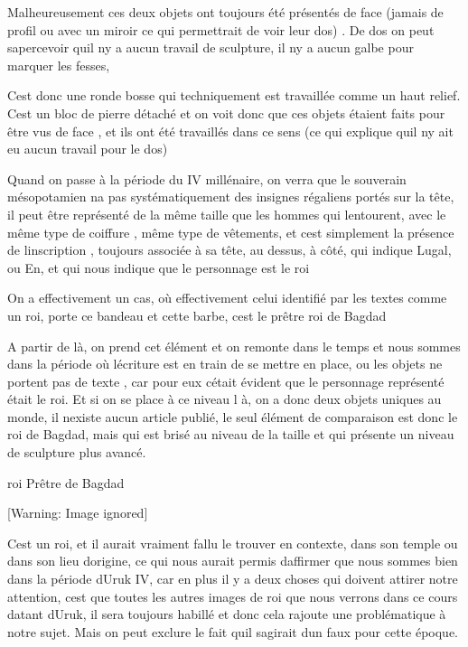 \documentclass{article}
\begin{document}
Malheureusement ces deux objets ont toujours été présentés de face
(jamais de profil ou avec un miroir ce qui permettrait de voir leur
dos) . De dos on peut s{\textquotesingle}apercevoir
qu{\textquotesingle}il n{\textquotesingle}y a aucun travail de
sculpture, il n{\textquotesingle}y a aucun galbe pour marquer les
fesses, 

C{\textquotesingle}est donc une ronde bosse qui techniquement est
travaillée comme un haut relief. C{\textquotesingle}est un bloc de
pierre détaché et on voit donc que ces objets étaient faits pour être
vus de face , et ils ont été travaillés dans ce sens (ce qui explique
qu{\textquotesingle}il n{\textquotesingle}y ait eu aucun travail pour
le dos)

Quand on passe à la période du IV millénaire, on verra que le souverain
mésopotamien n{\textquotesingle}a pas systématiquement des insignes
régaliens portés sur la tête, il peut être représenté de la même taille
que les hommes qui l{\textquotesingle}entourent, avec le même type de
coiffure , même type de vêtements, et c{\textquotesingle}est simplement
la présence de l{\textquotesingle}inscription , toujours associée à sa
tête, au dessus, à côté, qui indique Lugal, ou En, et qui nous indique
que le personnage est le roi

On a effectivement un cas, où effectivement celui identifié par les
textes comme un roi, porte ce bandeau et cette barbe,
c{\textquotesingle}est le prêtre roi de Bagdad

A partir de là, on prend cet élément et on remonte dans le temps et nous
sommes dans la période où l{\textquotesingle}écriture est en train de
se mettre en place, ou les objets ne portent pas de texte , car pour
eux c{\textquotesingle}était évident que le personnage représenté était
le roi. Et si on se place à ce niveau l à, on a donc deux objets
uniques au monde, il n{\textquotesingle}existe aucun article publié, le
seul élément de comparaison est donc le roi de Bagdad, mais qui est
brisé au niveau de la taille et qui présente un niveau de sculpture
plus avancé.

roi Prêtre de Bagdad

  [Warning: Image ignored] %
 

C{\textquotesingle}est un roi, et il aurait vraiment fallu le trouver en
contexte, dans son temple ou dans son lieu d{\textquotesingle}origine,
ce qui nous aurait permis d{\textquotesingle}affirmer que nous sommes
bien dans la période d{\textquotesingle}Uruk IV, car en plus il y a
deux choses qui doivent attirer notre attention, c{\textquotesingle}est
que toutes les autres images de roi que nous verrons dans ce cours
datant d{\textquotesingle}Uruk, il sera toujours habillé  et donc cela
rajoute une problématique à notre sujet. Mais on peut exclure le fait
qu{\textquotesingle}il s{\textquotesingle}agirait d{\textquotesingle}un
faux pour cette époque.
\end{document}
